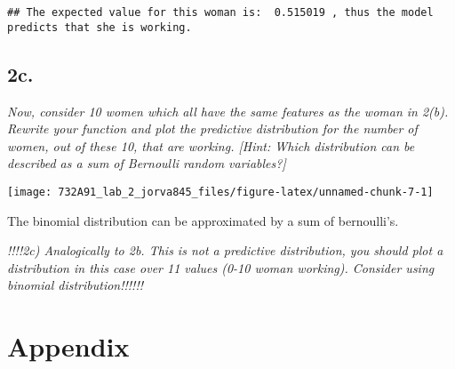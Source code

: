 \documentclass[]{article}
\begin{document}
\begin{verbatim}
## The expected value for this woman is:  0.515019 , thus the model predicts that she is working.
\end{verbatim}

\hypertarget{c.-1}{%
\subsection{2c.}\label{c.-1}}

\emph{Now, consider 10 women which all have the same features as the
woman in 2(b). Rewrite your function and plot the predictive
distribution for the number of women, out of these 10, that are working.
{[}Hint: Which distribution can be described as a sum of Bernoulli
random variables?{]}}

\begin{center}\texttt{[image: 732A91\_lab\_2\_jorva845\_files/figure-latex/unnamed-chunk-7-1]} \end{center}

The binomial distribution can be approximated by a sum of bernoulli's.

\emph{!!!!2c) Analogically to 2b. This is not a predictive distribution,
you should plot a distribution in this case over 11 values (0-10 woman
working). Consider using binomial distribution!!!!!!}

\newpage

\hypertarget{appendix}{%
\section{Appendix}\label{appendix}}
\end{document}
